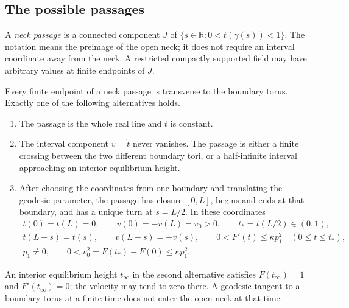 \subsection{The possible passages}

A \emph{neck passage} is a connected component $J$ of
$\{s\in\mathbb R:0<t(\gamma(s))<1\}$.  The notation means the preimage
of the open neck; it does not require an interval coordinate away from
the neck.  A restricted compactly supported field may have arbitrary
values at finite endpoints of $J$.

\begin{lemma}\label{lem:neck-passages}
Every finite endpoint of a neck passage is transverse to the boundary
torus.  Exactly one of the following alternatives holds.
\begin{enumerate}
\item The passage is the whole real line and $t$ is constant.
\item The interval component $v=\dot t$ never vanishes.  The passage is
either a finite crossing between the two different boundary tori, or a
half-infinite interval approaching an interior equilibrium height.
\item After choosing the coordinates from one boundary and translating
the geodesic parameter, the passage has closure $[0,L]$, begins and ends
at that boundary, and has a unique turn at $s=L/2$.  In these coordinates
\begin{gather}
 t(0)=t(L)=0,\qquad
 v(0)=-v(L)=v_0>0,\qquad t_*=t(L/2)\in(0,1),\label{eq:turn-data}\\
 t(L-s)=t(s),\qquad v(L-s)=-v(s),\qquad
 0<F'(t)\le\kappa p_1^2\quad(0\le t\le t_*),\label{eq:turn-concavity}\\
 p_1\ne0,\qquad 0<v_0^2=F(t_*)-F(0)\le\kappa p_1^2.
 \label{eq:turn-incidence}
\end{gather}
\end{enumerate}
An interior equilibrium height $t_\infty$ in the second alternative
satisfies $F(t_\infty)=1$ and $F'(t_\infty)=0$; the velocity may tend to
zero there.  A geodesic tangent to a boundary torus at a finite time does
not enter the open neck at that time.
\end{lemma}

